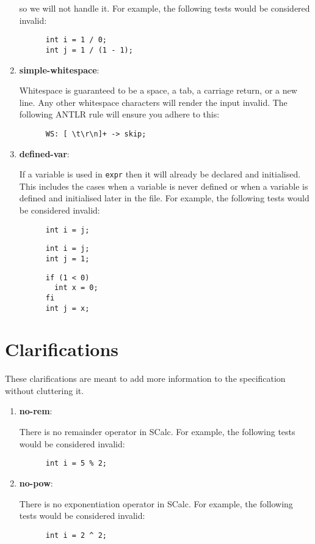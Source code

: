 \documentclass{article}
\newcommand{\code}[1]{\texttt{\textmd{#1}}}
\newcommand{\assertiondest}[1]{\hypertarget{#1}{\textbf{#1}:}}
\newcommand{\clarificationdest}[1]{\hypertarget{#1}{\textbf{#1}:}}
\begin{document}
\begin{enumerate}
    so we will not handle it. For example, the following tests would be considered invalid:
    \begin{lstlisting}
      int i = 1 / 0;
      int j = 1 / (1 - 1);
    \end{lstlisting}
  \item
    \assertiondest{simple-whitespace}
    Whitespace is guaranteed to be a space, a tab, a carriage return, or a new
    line. Any other whitespace characters will render the input invalid. The following ANTLR rule
    will ensure you adhere to this:
    \begin{lstlisting}
      WS: [ \t\r\n]+ -> skip;
    \end{lstlisting}
  \item
    \assertiondest{defined-var}
    If a variable is used in \code{expr} then it will already be declared and initialised. This
    includes the cases when a variable is never defined or when a variable is defined and
    initialised later in the file. For example, the following tests would be considered invalid:
    \begin{lstlisting}
      int i = j;
    \end{lstlisting}
    \begin{lstlisting}
      int i = j;
      int j = 1;
    \end{lstlisting}
    \begin{lstlisting}
      if (1 < 0)
        int x = 0;
      fi
      int j = x;
    \end{lstlisting}
\end{enumerate}

\section{Clarifications}
These clarifications are meant to add more information to the specification without cluttering it.
\begin{enumerate}
  \item
    \clarificationdest{no-rem}
    There is no remainder operator in SCalc. For example, the following tests would be considered
    invalid:
    \begin{lstlisting}
      int i = 5 % 2;
    \end{lstlisting}
  \item
    \clarificationdest{no-pow}
    There is no exponentiation operator in SCalc. For example, the following tests would be
    considered invalid:
    \begin{lstlisting}
      int i = 2 ^ 2;
    \end{lstlisting}
\end{enumerate}
\end{document}
